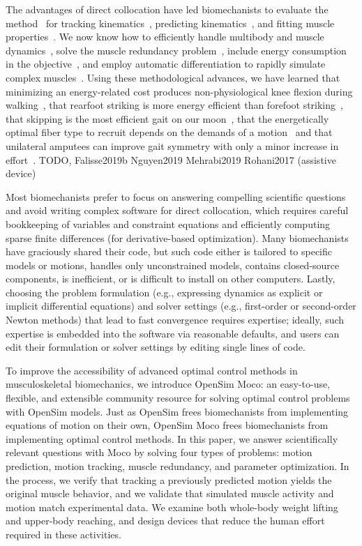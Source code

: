 \documentclass[10pt,letterpaper]{article}
\begin{document}
The advantages of direct collocation have led biomechanists to evaluate the method~\cite{Betts:2010,Umberger:2018ec,Mombaur:2016eb,Kelly:2017} for tracking kinematics~\cite{Lin:2017jp}, predicting kinematics~\cite{Porsa:2015dn,Meyer:2016gl,Lee:2016dn,KMoore:2018ea,Lin:2018ex}, and fitting muscle properties~\cite{Falisse:2016}. We now know how to efficiently handle multibody and muscle dynamics~\cite{vandenBogert:2011fv,Groote:2016dq}, solve the muscle redundancy problem~\cite{Groote:2016dq}, include energy consumption in the objective~\cite{Koelewijn:2018kw,Koelewijn:2019}, and employ automatic differentiation to rapidly simulate complex muscles~\cite{Falisse:2019a}. Using these methodological advances, we have learned that minimizing an energy-related cost produces non-physiological knee flexion during walking~\cite{Ackermann:2010dd}, that rearfoot striking is more energy efficient than forefoot striking~\cite{Miller:2015fc}, that skipping is the most efficient gait on our moon~\cite{Ackermann:2012}, that the energetically optimal fiber type to recruit depends on the demands of a motion~\cite{Lai:2018} and that unilateral amputees can improve gait symmetry with only a minor increase in effort~\cite{Koelewijn:2016bm}. TODO, Falisse2019b Nguyen2019 Mehrabi2019 Rohani2017 (assistive device)

Most biomechanists prefer to focus on answering compelling scientific questions and avoid writing complex software for direct collocation, which requires careful bookkeeping of variables and constraint equations and efficiently computing sparse finite differences (for derivative-based optimization). Many biomechanists have graciously shared their code, but such code either is tailored to specific models or motions, handles only unconstrained models, contains closed-source components, is inefficient, or is difficult to install on other computers. Lastly, choosing the problem formulation (e.g., expressing dynamics as explicit or implicit differential equations) and solver settings (e.g., first-order or second-order Newton methods) that lead to fast convergence requires expertise; ideally, such expertise is embedded into the software via reasonable defaults, and users can edit their formulation or solver settings by editing single lines of code.

To improve the accessibility of advanced optimal control methods in musculoskeletal biomechanics, we introduce OpenSim Moco: an easy-to-use, flexible, and extensible community resource for solving optimal control problems with OpenSim models. Just as OpenSim frees biomechanists from implementing equations of motion on their own, OpenSim Moco frees biomechanists from implementing optimal control methods. In this paper, we answer scientifically relevant questions with Moco by solving four types of problems: motion prediction, motion tracking, muscle redundancy, and parameter optimization. In the process, we verify that tracking a previously predicted motion yields the original muscle behavior, and we validate that simulated muscle activity and motion match experimental data. We examine both whole-body weight lifting and upper-body reaching, and design devices that reduce the human effort required in these activities.
\end{document}
